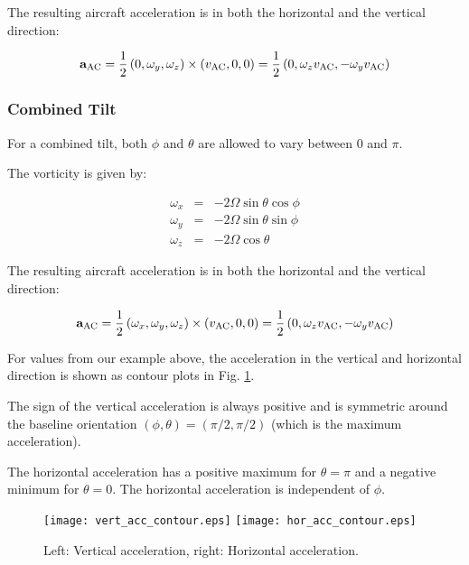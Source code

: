 \documentclass[smallextended]{svjour3}       %
\begin{document}
The resulting aircraft acceleration is in both the horizontal and the vertical direction:

\begin{equation}
{\bf a}_{\rm AC} = \frac{1}{2} \left( 0,\omega_y,\omega_z \right) \times \left(v_{\rm AC},0,0\right) = \frac{1}{2} \left( 0,\omega_zv_{\rm AC},-\omega_y v_{\rm AC} \right)
\end{equation}

\subsubsection{Combined Tilt}

For a combined tilt, both $\phi$ and $\theta$ are allowed to vary between $0$ and $\pi$.

The vorticity is given by:

\begin{eqnarray}
  \omega_x &=& -2 \Omega \sin \theta \cos \phi \\
  \omega_y &=& -2 \Omega \sin \theta \sin \phi\\
  \omega_z &=& -2 \Omega \cos \theta
\end{eqnarray}

The resulting aircraft acceleration is in both the horizontal and the vertical direction:

\begin{equation}
{\bf a}_{\rm AC} = \frac{1}{2} \left( \omega_x,\omega_y,\omega_z \right) \times \left(v_{\rm AC},0,0\right) = \frac{1}{2} \left( 0,\omega_zv_{\rm AC},-\omega_y v_{\rm AC} \right)
\end{equation}

For values from our example above, the acceleration in the vertical and horizontal direction is shown as contour plots in Fig. \ref{fig:cont_vert_hor_acc}.

The sign of the vertical acceleration is always positive and is symmetric around the baseline orientation $(\phi,\theta)=(\pi/2,\pi/2)$ (which is the maximum acceleration).

The horizontal acceleration has a positive maximum for $\theta=\pi$ and a negative minimum for $\theta=0$. The horizontal acceleration is independent of $\phi$.

\begin{figure}
\texttt{[image: vert\_acc\_contour.eps]}
\texttt{[image: hor\_acc\_contour.eps]}
\caption{Left: Vertical acceleration, right: Horizontal acceleration.}
\label{fig:cont_vert_hor_acc}
\end{figure}
\end{document}
